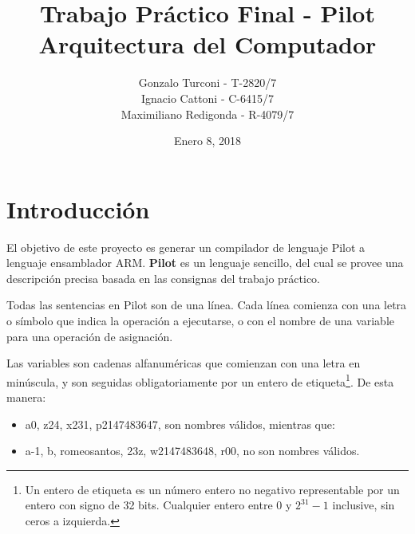 \documentclass[12pt,spanish]{article}
\begin{document}
 
 
\title{Trabajo Práctico Final - Pilot \\
 \large Arquitectura del Computador
}
\date{Enero 8, 2018}
\author{Gonzalo Turconi - T-2820/7 \\
        Ignacio Cattoni - C-6415/7 \\
        Maximiliano Redigonda - R-4079/7}
\maketitle

\section{Introducción}
El objetivo de este proyecto es generar un compilador de lenguaje Pilot a lenguaje ensamblador ARM. \textbf{Pilot} es un lenguaje sencillo, del cual se provee una descripción precisa basada en las consignas del trabajo práctico.

Todas las sentencias en Pilot son de una línea. Cada línea comienza con una letra o símbolo que indica la operación a ejecutarse, o con el nombre de una variable para una operación de asignación.

Las variables son cadenas alfanuméricas que comienzan con una letra en minúscula, y son seguidas obligatoriamente por un entero de etiqueta\footnote{Un entero de etiqueta es un número entero no negativo representable por un entero con signo de 32 bits. Cualquier entero entre $0$ y $2^{31}-1$ inclusive, sin ceros a izquierda.}. De esta manera:
\begin{itemize}
\item{a0, z24, x231, p2147483647, son nombres válidos, mientras que:}
\item{a-1, b, romeosantos, 23z, w2147483648, r00, no son nombres válidos.}
\end{itemize}
\end{document}
